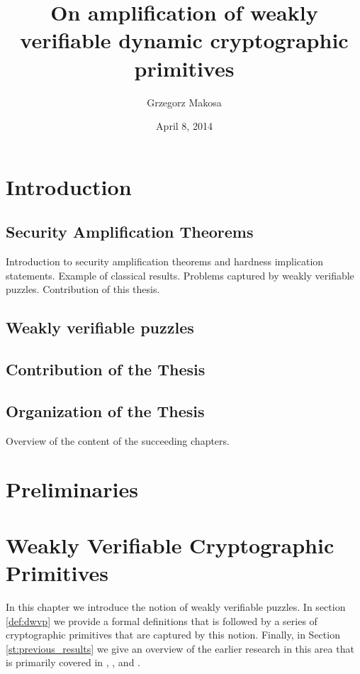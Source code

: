 \documentclass[11pt,a4paper,titlepage]{memoir}
\title{On amplification of weakly verifiable dynamic cryptographic primitives}
\author{Grzegorz Makosa}
\date{April 8, 2014}
\begin{document}
\frontmatter

%

\cleartorecto
\tableofcontents
\mainmatter

\chapter{Introduction}
\section{Security Amplification Theorems}
Introduction to security amplification theorems and hardness implication statements.
Example of classical results. Problems captured by weakly verifiable puzzles.
Contribution of this thesis.
\section{Weakly verifiable puzzles}
\section{Contribution of the Thesis}
\section{Organization of the Thesis}
Overview of the content of the succeeding chapters.

\chapter{Preliminaries}


\chapter{Weakly Verifiable Cryptographic Primitives}
In this chapter we introduce the notion of weakly verifiable puzzles. In section \ref{def:dwvp} we provide a formal definitions that
is followed by a series of cryptographic primitives that are captured by this notion.
Finally, in Section \ref{st:previous_results} we give an overview of the earlier research in this area
that is primarily covered in \cite{canetti2004hardness}, \cite{Dodis:2009:SAI:1530441.1530450}, and \cite{DBLP:journals/corr/abs-1002-3534}.
\end{document}

